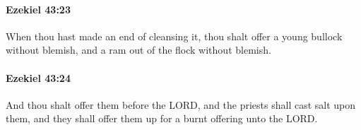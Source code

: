 		\paragraph{Ezekiel 43:23} %
			\label{EZEKIEL-43-23}

			When thou hast made an end of cleansing it, thou shalt offer a young bullock without blemish, and a ram out of the flock without blemish.


		\paragraph{Ezekiel 43:24} %
			\label{EZEKIEL-43-24}

			And thou shalt offer them before the LORD, and the priests shall cast salt upon them, and they shall offer them up for a burnt offering unto the LORD.


